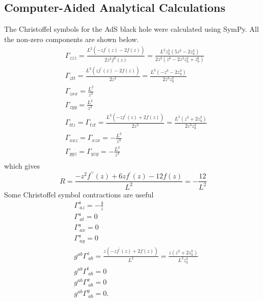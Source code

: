 \documentclass[12pt]{report}
\newcommand{\sympy}{SymPy}
\begin{document}
\begin{appendices}
\chapter{Computer-Aided Analytical Calculations\label{CAS}}
The Christoffel symbols for the AdS black hole were calculated using \sympy. All the non-zero components are shown below.
\begin{equation}
\begin{split}
&
\Gamma_{zzz}=\frac{L^{2} \left(- z f^\prime\left(z\right) - 2 f\left(z\right)\right)}{2 z^{3} f^{2}\left(z\right)}=\frac{L^{2} z_h^{3} \left(5 z^{3} - 2 z_h^{3}\right)}{2 z^{3} \left(z^{6} - 2 z^{3} z_h^{3} + z_h^{6}\right)}\\
&
\Gamma_{ztt}=\frac{L^{2} \left(z f^\prime\left(z\right) - 2 f\left(z\right)\right)}{2 z^{3}}=\frac{L^{2} \left(- z^{3} - 2 z_h^{3}\right)}{2 z^{3} z_h^{3}}\\
&
\Gamma_{zxx}=\frac{L^{2}}{z^{3}}\\
&
\Gamma_{zyy}=\frac{L^{2}}{z^{3}}\\
&
\Gamma_{ttz}=
\Gamma_{tzt}=\frac{L^{2} \left(- z f^\prime\left(z\right) + 2 f\left(z\right)\right)}{2 z^{3}}=\frac{L^{2} \left(z^{3} + 2 z_h^{3}\right)}{2 z^{3} z_h^{3}}\\
&
\Gamma_{xxz}=
\Gamma_{xzx}=- \frac{L^{2}}{z^{3}}\\
&
\Gamma_{yyz}=
\Gamma_{yzy}=- \frac{L^{2}}{z^{3}}\\
\end{split}\label{CS}
\end{equation}
which gives
\begin{equation}
 R=\frac{- z^{2} f^{\prime\prime}\left(z\right) + 6 z f^\prime\left(z\right) - 12 f\left(z\right)}{L^{2}}=- \frac{12}{L^{2}}
\end{equation}
Some Christoffel symbol contractions are useful
\begin{equation}
\begin{split}
&\Gamma^a_{\ az}=- \frac{4}{z}\\
&\Gamma^a_{\ at}=0\\
&\Gamma^a_{\ ax}=0\\
&\Gamma^a_{\ ay}=0\\
&g^{ab}\Gamma^z_{\ ab}=\frac{z \left(- z f^\prime\left(z\right) + 2 f\left(z\right)\right)}{L^{2}}=\frac{z \left(z^{3} + 2 z_h^{3}\right)}{L^{2} z_h^{3}}\\
&g^{ab}\Gamma^t_{\ ab}=0\\
&g^{ab}\Gamma^x_{\ ab}=0\\
&g^{ab}\Gamma^y_{\ ab}=0.

\end{split}
\end{equation}
\end{appendices}
\end{document}
